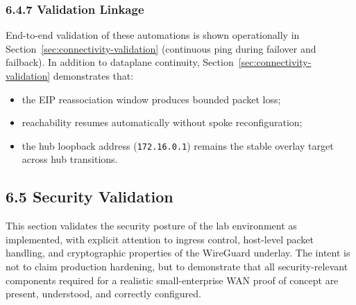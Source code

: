 \documentclass[11pt]{article}
\begin{document}
%
%
%
\subsubsection{6.4.7 Validation Linkage}

End-to-end validation of these automations is shown operationally in Section~\ref{sec:connectivity-validation} (continuous ping during failover and failback). In addition to dataplane continuity, Section~\ref{sec:connectivity-validation} demonstrates that:
\begin{itemize}
  \item the EIP reassociation window produces bounded packet loss;
  \item reachability resumes automatically without spoke reconfiguration;
  \item the hub loopback address (\texttt{172.16.0.1}) remains the stable overlay target across hub transitions.
\end{itemize}

%
%
%
\subsection{6.5 Security Validation}
\label{sec:security-validation}

This section validates the security posture of the lab environment as implemented, with explicit attention to ingress control, host-level packet handling, and cryptographic properties of the WireGuard underlay. The intent is not to claim production hardening, but to demonstrate that all security-relevant components required for a realistic small-enterprise WAN proof of concept are present, understood, and correctly configured.
\end{document}
